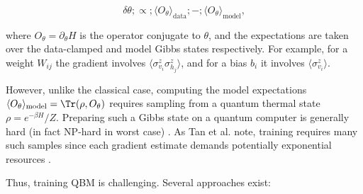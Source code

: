 $$

\delta \theta ;\propto; \langle O_\theta \rangle_{\text{data}} ;-; \langle O_\theta \rangle_{\text{model}},

$$

where $O_\theta = \partial_\theta H$ is the operator conjugate to $\theta$, and the expectations are taken over the data-clamped and model Gibbs states respectively. For example, for a weight $W_{ij}$ the gradient involves $\langle \sigma^z_{v_i}\sigma^z_{h_j}\rangle$, and for a bias $b_i$ it involves $\langle\sigma^z_{v_i}\rangle$.



However, unlike the classical case, computing the model expectations $\langle O_\theta\rangle_{\text{model}}=\Tr(\rho,O_\theta)$ requires sampling from a quantum thermal state $\rho=e^{-\beta H}/Z$.  Preparing such a Gibbs state on a quantum computer is generally hard (in fact NP-hard in worst case) .  As Tan et al. note, training requires many such samples since each gradient estimate demands potentially exponential resources .



Thus, training QBM is challenging. Several approaches exist:



